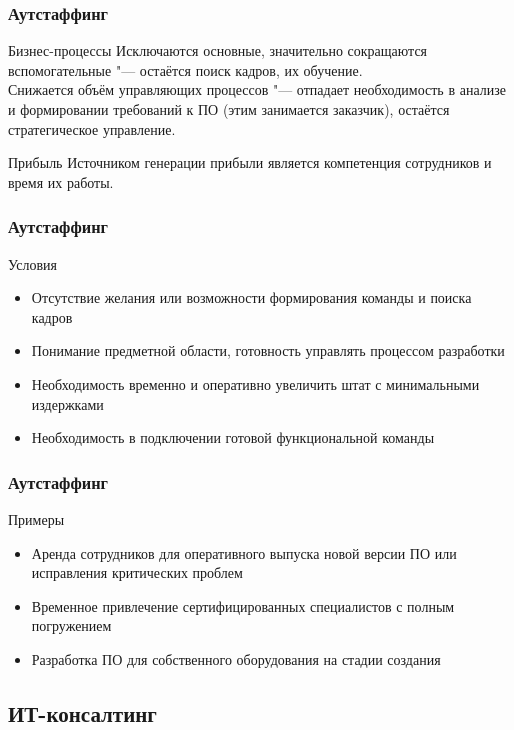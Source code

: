 \documentclass{../industrial-development}
\begin{document}
\begin{frame} \frametitle{Аутстаффинг}
	\begin{block}{Бизнес-процессы}
		Исключаются основные, значительно сокращаются вспомогательные "--- остаётся поиск кадров, их обучение.\\
		Снижается объём управляющих процессов "--- отпадает необходимость в анализе и формировании требований к ПО (этим занимается заказчик), остаётся стратегическое управление.
	\end{block}
	\begin{block}{Прибыль}
		Источником генерации прибыли является компетенция сотрудников и время их работы.
	\end{block}
\end{frame}
\lecturenotes


\begin{frame} \frametitle{Аутстаффинг}
	\begin{block}{Условия}
		\begin{itemize}
			\item Отсутствие желания или возможности формирования команды и поиска кадров
			\item Понимание предметной области, готовность управлять процессом разработки
			\item Необходимость временно и оперативно увеличить штат с минимальными издержками
			\item Необходимость в подключении готовой функциональной команды
		\end{itemize}
	\end{block}
\end{frame}
\lecturenotes


\begin{frame} \frametitle{Аутстаффинг}
	\begin{block}{Примеры}
		\begin{itemize}
			\item Аренда сотрудников для оперативного выпуска новой версии ПО или исправления критических проблем
			\item Временное привлечение сертифицированных специалистов с полным погружением
			\item Разработка ПО для собственного оборудования на стадии создания
		\end{itemize}
	\end{block}
\end{frame}
\lecturenotes


\subsection{ИТ-консалтинг}
\end{document}
